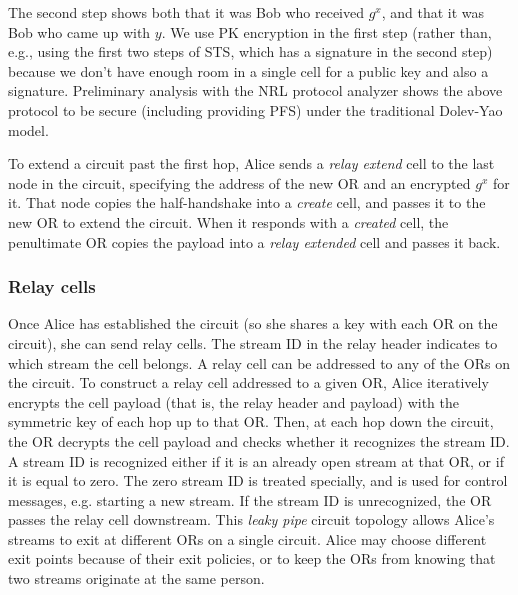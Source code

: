 \documentclass[times,10pt,twocolumn]{article}
\begin{document}
The second step shows both that it was Bob
who received $g^x$, and that it was Bob who came up with $y$. We use
PK encryption in the first step (rather than, e.g., using the first two
steps of STS, which has a signature in the second step) because we
don't have enough room in a single cell for a public key and also a
signature. Preliminary analysis with the NRL protocol analyzer shows
the above protocol to be secure (including providing PFS) under the
traditional Dolev-Yao model.

To extend a circuit past the first hop, Alice sends a \emph{relay extend}
cell to the last node in the circuit, specifying the address of the new
OR and an encrypted $g^x$ for it. That node copies the half-handshake
into a \emph{create} cell, and passes it to the new OR to extend the
circuit. When it responds with a \emph{created} cell, the penultimate OR
copies the payload into a \emph{relay extended} cell and passes it back.

\subsubsection{Relay cells}
Once Alice has established the circuit (so she shares a key with each
OR on the circuit), she can send relay cells.
The stream ID in the relay header indicates to which stream the cell belongs.
A relay cell can be addressed to any of the ORs on the circuit. To
construct a relay cell addressed to a given OR, Alice iteratively
encrypts the cell payload (that is, the relay header and payload)
with the symmetric key of each hop up to that OR. Then, at each hop
down the circuit, the OR decrypts the cell payload and checks whether
it recognizes the stream ID.  A stream ID is recognized either if it
is an already open stream at that OR, or if it is equal to zero. The
zero stream ID is treated specially, and is used for control messages,
e.g. starting a new stream. If the stream ID is unrecognized, the OR
passes the relay cell downstream. This \emph{leaky pipe} circuit topology
allows Alice's streams to exit at different ORs on a single circuit.  
Alice may choose different exit points because of their exit policies,
or to keep the ORs from knowing that two streams
originate at the same person.
\end{document}
